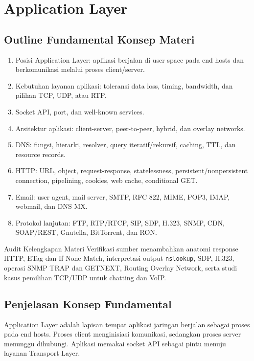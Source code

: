 \section{Application Layer}

\subsection{Outline Fundamental Konsep Materi}

\begin{enumerate}
    \item Posisi Application Layer: aplikasi berjalan di user space pada end hosts dan berkomunikasi melalui proses client/server.
    \item Kebutuhan layanan aplikasi: toleransi data loss, timing, bandwidth, dan pilihan TCP, UDP, atau RTP.
    \item Socket API, port, dan well-known services.
    \item Arsitektur aplikasi: client-server, peer-to-peer, hybrid, dan overlay networks.
    \item DNS: fungsi, hierarki, resolver, query iteratif/rekursif, caching, TTL, dan resource records.
    \item HTTP: URL, object, request-response, statelessness, persistent/nonpersistent connection, pipelining, cookies, web cache, conditional GET.
    \item Email: user agent, mail server, SMTP, RFC 822, MIME, POP3, IMAP, webmail, dan DNS MX.
    \item Protokol lanjutan: FTP, RTP/RTCP, SIP, SDP, H.323, SNMP, CDN, SOAP/REST, Gnutella, BitTorrent, dan RON.
\end{enumerate}

\begin{cmt}{Audit Kelengkapan Materi}{}
Verifikasi sumber menambahkan anatomi response HTTP, ETag dan If-None-Match, interpretasi output \texttt{nslookup}, SDP, H.323, operasi SNMP TRAP dan GETNEXT, Routing Overlay Network, serta studi kasus pemilihan TCP/UDP untuk chatting dan VoIP.
\end{cmt}

\subsection{Penjelasan Konsep Fundamental}

\begin{jawab}
Application Layer adalah lapisan tempat aplikasi jaringan berjalan sebagai proses pada end hosts. Proses client menginisiasi komunikasi, sedangkan proses server menunggu dihubungi. Aplikasi memakai socket API sebagai pintu menuju layanan Transport Layer.
\end{jawab}

